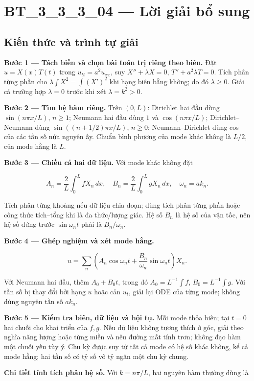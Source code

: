 \documentclass[10pt,a4paper]{article}
\begin{document}
\section*{BT\_3\_3\_3\_04 — Lời giải bổ sung}
\subsection*{Kiến thức và trình tự giải}
\textbf{Bước 1 — Tách biến và chọn bài toán trị riêng theo biên.} Đặt $u=X(x)T(t)$ trong $u_{tt}=a^2u_{xx}$, suy $X''+\lambda X=0$, $T''+a^2\lambda T=0$. Tích phân từng phần cho $\lambda\int X^2=\int (X')^2$ khi hạng biên bằng không; do đó $\lambda\ge0$. Giải cả trường hợp $\lambda=0$ trước khi xét $\lambda=k^2>0$.

\textbf{Bước 2 — Tìm hệ hàm riêng.} Trên $(0,L)$: Dirichlet hai đầu dùng $\sin(n\pi x/L)$, $n\ge1$; Neumann hai đầu dùng $1$ và $\cos(n\pi x/L)$; Dirichlet–Neumann dùng $\sin((n+1/2)\pi x/L)$, $n\ge0$; Neumann–Dirichlet dùng cos của các tần số nửa nguyên ấy. Chuẩn bình phương của mode khác không là $L/2$, của mode hằng là $L$.

\textbf{Bước 3 — Chiếu cả hai dữ liệu.} Với mode khác không đặt


\[
A_n=\frac2L\int_0^L fX_n\,dx,\quad B_n=\frac2L\int_0^L gX_n\,dx,\quad \omega_n=ak_n.
\]


Tích phân từng khoảng nếu dữ liệu chia đoạn; dùng tích phân từng phần hoặc công thức tích–tổng khi là đa thức/lượng giác. Hệ số $B_n$ là hệ số của vận tốc, nên hệ số đứng trước $\sin\omega_nt$ phải là $B_n/\omega_n$.

\textbf{Bước 4 — Ghép nghiệm và xét mode hằng.}


\[
u=\sum_n\left(A_n\cos\omega_nt+\frac{B_n}{\omega_n}\sin\omega_nt\right)X_n.
\]


Với Neumann hai đầu, thêm $A_0+B_0t$, trong đó $A_0=L^{-1}\int f$, $B_0=L^{-1}\int g$. Với tần số bị thay đổi bởi hạng $u$ hoặc cản $u_t$, giải lại ODE của từng mode; không dùng nguyên tần số $ak_n$.

\textbf{Bước 5 — Kiểm tra biên, dữ liệu và hội tụ.} Mỗi mode thỏa biên; tại $t=0$ hai chuỗi cho khai triển của $f,g$. Nếu dữ liệu không tương thích ở góc, giải theo nghĩa năng lượng hoặc từng miền và nêu đường mất tính trơn; không đạo hàm một chuỗi yếu tùy ý. Chu kỳ được suy từ tất cả mode có hệ số khác không, kể cả mode hằng; hai tần số có tỷ số vô tỷ ngăn một chu kỳ chung.

\textbf{Chi tiết tính tích phân hệ số.} Với $k=n\pi/L$, hai nguyên hàm thường dùng là
\end{document}
